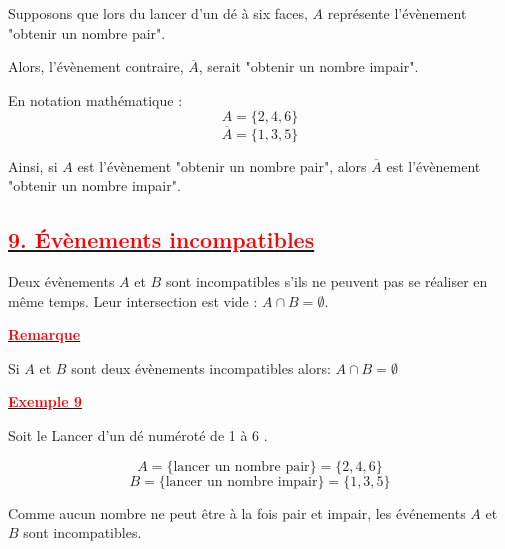 \documentclass[12pt,a4paper]{article}
\begin{document}
Supposons que lors du lancer d'un dé à six faces, $A$ représente l'évènement "obtenir un nombre pair".

Alors, l'évènement contraire, $\overline{A}$, serait "obtenir un nombre impair".

En notation mathématique :
\[ A = \{2, 4, 6\} \]
\[ \overline{A} = \{1, 3, 5\} \]

Ainsi, si $A$ est l'évènement "obtenir un nombre pair", alors $\overline{A}$ est l'évènement "obtenir un nombre impair".

\subsection*{\underline{\textbf{\textcolor{red}{9. Évènements incompatibles}}}}
Deux évènements $A$ et $B$ sont incompatibles s'ils ne peuvent pas se réaliser en même temps. Leur intersection est vide : $A \cap B = \emptyset$.


\underline{\textbf{\textcolor{red}{Remarque}}}

Si $A$ et $B$ sont deux évènements incompatibles alors: $A\cap B=\emptyset$ 

\underline{\textbf{\textcolor{red}{Exemple 9}}}

Soit le Lancer d’un dé numéroté de 1 à 6 .

\[ A = \{\text{lancer un nombre pair}\} = \{2, 4, 6\} \]
\[ B = \{\text{lancer un nombre impair}\} = \{1, 3, 5\} \]

Comme aucun nombre ne peut être à la fois pair et impair, les événements \(A\) et \(B\) sont incompatibles.
\end{document}

